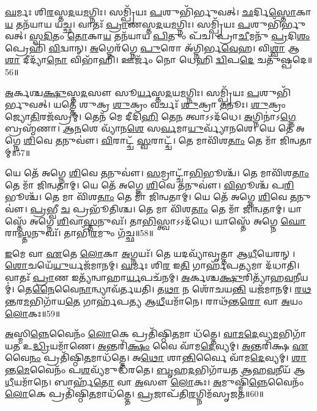\-\ul{𑌘}\-𑌰𑍍𑌮𑌃 𑌶𑌿\-\ul{𑌰}\-𑌸𑍍𑌤\-\ul{𑌦}\-𑌯\-\ul{𑌮}\-𑌗𑍍𑌨𑌿𑌃।
𑌸𑌮𑍍𑌪𑍍𑌰𑌿᳴𑌯𑌃 \ul{𑌪}\-𑌶𑍁𑌭𑌿᳴𑌰𑍍𑌭𑍁𑌵𑌤𑍍।
\-\ul{𑌛}\-𑌰𑍍𑌦𑌿\-\ul{𑌸𑍍𑌤𑍋}\-𑌕𑌾\-\ul{𑌯} 𑌤𑌨᳴𑌯𑌾𑌯 𑌯𑌚𑍍𑌛।
𑌵𑌾𑌤𑌃᳴ \ul{𑌪𑍍𑌰𑌾}\-𑌣𑌸𑍍𑌤\-\ul{𑌦}\-𑌯\-\ul{𑌮}\-𑌗𑍍𑌨𑌿𑌃।
𑌸𑌮𑍍𑌪𑍍𑌰𑌿᳴𑌯𑌃 \ul{𑌪}\-𑌶𑍁𑌭𑌿᳴𑌰𑍍𑌭𑍁𑌵𑌤𑍍।
\-\ul{𑌸𑍍𑌵}\-\-\ul{𑌦𑌿}\-𑌤𑌂 \ul{𑌤𑍋}\-𑌕𑌾\-\ul{𑌯} 𑌤𑌨᳴𑌯𑌾𑌯 \ul{𑌪𑌿}\-𑌤𑍁𑌂 𑌪᳴𑌚।
𑌪𑍍𑌰𑌾\-\ul{𑌚𑍀}\-𑌮𑌨𑍁᳴ \ul{𑌪𑍍𑌰}\-𑌦𑌿\-\ul{𑌶𑌂} 𑌪𑍍𑌰𑍇𑌹𑌿᳴ \ul{𑌵𑌿}\-𑌦𑍍𑌵𑌾𑌨𑍍।
\-\ul{𑌅}\-𑌗𑍍𑌨𑍇𑌰᳴𑌗𑍍𑌨𑍇 \ul{𑌪𑍁}\-𑌰𑍋 𑌅᳴𑌗𑍍𑌨𑌿𑌰𑍍𑌭\-\ul{𑌵𑍇}\-𑌹।
𑌵𑌿\-\ul{𑌶𑍍𑌵𑌾} 𑌆\-\ul{𑌶𑌾} 𑌦𑍀𑌦𑍍𑌯𑌾᳴\-\ul{𑌨𑍋} 𑌵𑌿𑌭𑌾᳴𑌹𑌿।
𑌊𑌰𑍍𑌜𑌂᳴ 𑌨𑍋 𑌧𑍇𑌹𑌿 \ul{𑌦𑍍𑌵𑌿}\-𑌪\-\ul{𑌦𑍇} 𑌚𑌤𑍁᳴𑌷𑍍𑌪𑌦𑍇॥56॥

\-\ul{𑌅}\-𑌰𑍍𑌕𑌶𑍍𑌚\-\ul{𑌕𑍍𑌷𑍁}\-𑌸𑍍𑌤\-\ul{𑌦}\-𑌸𑍗 𑌸𑍂\-\ul{𑌰𑍍𑌯}\-𑌸𑍍𑌤\-\ul{𑌦}\-𑌯\-\ul{𑌮}\-𑌗𑍍𑌨𑌿𑌃।
𑌸𑌮𑍍𑌪𑍍𑌰𑌿᳴𑌯𑌃 \ul{𑌪}\-𑌶𑍁𑌭𑌿᳴𑌰𑍍𑌭𑍁𑌵𑌤𑍍।
𑌯𑌤𑍍𑌤𑍇᳴ 𑌶𑍁𑌕𑍍𑌰 \ul{𑌶𑍁}\-𑌕𑍍𑌰𑌂 𑌵𑌰𑍍𑌚𑌃᳴ \ul{𑌶𑍁}\-𑌕𑍍𑌰𑌾 \ul{𑌤}\-𑌨𑍂𑌃।
\-\ul{𑌶𑍁}\-𑌕𑍍𑌰𑌂 𑌜𑍍𑌯𑍋\-\ul{𑌤𑌿}\-𑌰𑌜᳴𑌸𑍍𑌰𑌮𑍍।
𑌤𑍇𑌨᳴ 𑌮𑍇 𑌦𑍀𑌦𑌿\-\ul{𑌹𑌿} 𑌤𑍇\-\ul{𑌨} 𑌤𑍍𑌵𑌾𑌽𑌽𑌦᳴𑌧𑍇।
\-\ul{𑌅}\-𑌗𑍍𑌨𑌿𑌨𑌾॑\-𑌽\-\ul{𑌗𑍍𑌨𑍇} 𑌬𑍍𑌰𑌹𑍍𑌮᳴𑌣𑌾।
\-\ul{𑌆}\-\-\ul{𑌨}\-𑌶𑍇 𑌵𑍍𑌯𑌾᳴𑌨\-\ul{𑌶𑍇} 𑌸\-\ul{𑌰𑍍𑌵}\-𑌮𑌾\-\ul{𑌯𑍁}\-𑌰𑍍𑌵𑍍𑌯𑌾᳴𑌨𑌶𑍇।
𑌯𑍇 𑌤𑍇᳴ 𑌅𑌗𑍍𑌨𑍇 \ul{𑌶𑌿}\-𑌵𑍇 \ul{𑌤}\-𑌨𑍁𑌵𑍗॑।
\-\ul{𑌵𑌿}\-𑌰𑌾𑌟𑍍𑌚᳴ \ul{𑌸𑍍𑌵}\-𑌰𑌾𑌟𑍍𑌚᳴।
𑌤𑍇 𑌮𑌾𑌵𑌿᳴𑌶\-\ul{𑌤𑌾𑌂} 𑌤𑍇 𑌮𑌾᳴ 𑌜𑌿𑌨𑍍𑌵𑌤𑌾𑌮𑍍॥57॥

𑌯𑍇 𑌤𑍇᳴ 𑌅𑌗𑍍𑌨𑍇 \ul{𑌶𑌿}\-𑌵𑍇 \ul{𑌤}\-𑌨𑍁𑌵𑍗॑।
\-\ul{𑌸}\-𑌮𑍍𑌰𑌾𑌟𑍍𑌚𑌾᳴\-\ul{𑌭𑌿}\-𑌭𑍂𑌶𑍍𑌚᳴।
𑌤𑍇 𑌮𑌾𑌵𑌿᳴𑌶\-\ul{𑌤𑌾𑌂} 𑌤𑍇 𑌮𑌾᳴ 𑌜𑌿𑌨𑍍𑌵𑌤𑌾𑌮𑍍।
𑌯𑍇 𑌤𑍇᳴ 𑌅𑌗𑍍𑌨𑍇 \ul{𑌶𑌿}\-𑌵𑍇 \ul{𑌤}\-𑌨𑍁𑌵𑍗॑।
\-\ul{𑌵𑌿}\-𑌭𑍂𑌶𑍍𑌚᳴ 𑌪\-\ul{𑌰𑌿}\-𑌭𑍂𑌶𑍍𑌚᳴।
𑌤𑍇 𑌮𑌾 𑌵𑌿᳴𑌶\-\ul{𑌤𑌾𑌂} 𑌤𑍇 𑌮𑌾᳴ 𑌜𑌿𑌨𑍍𑌵𑌤𑌾𑌮𑍍।
𑌯𑍇 𑌤𑍇᳴ 𑌅𑌗𑍍𑌨𑍇 \ul{𑌶𑌿}\-𑌵𑍇 \ul{𑌤}\-𑌨𑍁𑌵𑍗॑।
\-\ul{𑌪𑍍𑌰}\-𑌭𑍍𑌵𑍀 \ul{𑌚} 𑌪𑍍𑌰𑌭𑍂᳴𑌤𑌿𑌶𑍍𑌚।
𑌤𑍇 𑌮𑌾 𑌵𑌿᳴𑌶\-\ul{𑌤𑌾𑌂} 𑌤𑍇 𑌮𑌾᳴ 𑌜𑌿𑌨𑍍𑌵𑌤𑌾𑌮𑍍।
𑌯𑌾𑌸𑍍𑌤𑍇᳴ 𑌅𑌗𑍍𑌨𑍇 \ul{𑌶𑌿}\-𑌵𑌾\-\ul{𑌸𑍍𑌤}\-𑌨𑍁𑌵𑌃᳴।
𑌤𑌾\-\ul{𑌭𑌿}\-𑌸𑍍𑌤𑍍𑌵𑌾𑌽𑌽𑌦᳴𑌧𑍇।
𑌯𑌾𑌸𑍍𑌤𑍇᳴ 𑌅𑌗𑍍𑌨𑍇 \ul{𑌘𑍋}\-𑌰𑌾\-\ul{𑌸𑍍𑌤}\-𑌨𑍁𑌵𑌃᳴।
𑌤𑌾𑌭𑌿᳴\-\ul{𑌰}\-𑌮𑍁𑌂 𑌗᳴𑌚𑍍𑌛॥58॥\anuvakamend[𑌚𑌤𑍁᳴𑌷𑍍𑌪𑌦𑍇 𑌜𑌿𑌨𑍍𑌵𑌤𑌾𑌂 \ul{𑌤}\-𑌨𑍁\-\ul{𑌵}\-𑌸𑍍𑌤𑍍𑌰𑍀𑌣𑌿᳴ 𑌚]

\-\ul{𑌇}\-𑌮𑍇 𑌵𑌾 \ul{𑌏}\-𑌤𑍇 \ul{𑌲𑍋}\-𑌕𑌾 \ul{𑌅}\-𑌗𑍍𑌨𑌯𑌃᳴।
𑌤𑍇 𑌯𑌦𑌵𑍍𑌯𑌾᳴𑌵𑍃𑌤𑍍𑌤𑌾 𑌆\-\ul{𑌧𑍀}\-𑌯𑍇𑌰𑌨𑍍।
\-\ul{𑌶𑍋}\-𑌚𑌯𑍇᳴\-\ul{𑌯𑍁}\-𑌰𑍍𑌯𑌜᳴𑌮𑌾𑌨𑌮𑍍।
\-\ul{𑌘}\-𑌰𑍍𑌮𑌃 𑌶𑌿\-\ul{𑌰} 𑌇\-\ul{𑌤𑌿} 𑌗𑌾𑌰𑍍\mbox{}𑌹᳴𑌪\-\ul{𑌤𑍍𑌯}\-𑌮𑌾 𑌦᳴𑌧𑌾𑌤𑌿।
𑌵𑌾𑌤𑌃᳴ \ul{𑌪𑍍𑌰𑌾}\-𑌣 𑌇𑌤𑍍𑌯᳴𑌨𑍍𑌵𑌾𑌹𑌾\-\ul{𑌰𑍍𑌯}\-𑌪𑌚᳴𑌨𑌮𑍍।
\-\ul{𑌅}\-𑌰𑍍𑌕𑌶𑍍𑌚\-\ul{𑌕𑍍𑌷𑍁}\-𑌰𑌿𑌤𑍍𑌯𑌾᳴𑌹\-\ul{𑌵}\-𑌨𑍀𑌯𑌮𑍍॑।
𑌤𑍇\-\ul{𑌨𑍈}\-𑌵𑍈\-\ul{𑌨𑌾}\-𑌨𑍍𑌵𑍍𑌯𑌾𑌵᳴𑌰𑍍𑌤𑌯𑌤𑌿।
𑌤\-\ul{𑌥𑌾} 𑌨 𑌶𑍋᳴𑌚𑌯\-\ul{𑌨𑍍𑌤𑌿} 𑌯𑌜᳴𑌮𑌾𑌨𑌮𑍍।
\-\ul{𑌰}\-\-\ul{𑌥}\-\-\ul{𑌨𑍍𑌤}\-𑌰\-\ul{𑌮}\-𑌭𑌿𑌗𑌾᳴𑌯\-\ul{𑌤𑍇} 𑌗𑌾𑌰𑍍\mbox{}𑌹᳴𑌪𑌤𑍍𑌯 𑌆\-\ul{𑌧𑍀}\-𑌯𑌮𑌾᳴𑌨𑍇।
𑌰𑌾𑌥᳴𑌨𑍍𑌤\-\ul{𑌰𑍋} 𑌵𑌾 \ul{𑌅}\-𑌯𑌂 \ul{𑌲𑍋}\-𑌕𑌃॥59॥

\-\ul{𑌅}\-𑌸𑍍𑌮𑌿\-\ul{𑌨𑍍𑌨𑍇}\-𑌵𑍈𑌨𑌂᳴ \ul{𑌲𑍋}\-𑌕𑍇 𑌪𑍍𑌰𑌤𑌿᳴\-𑌷𑍍𑌠𑌿\-\ul{𑌤}\-𑌮𑌾 𑌧᳴𑌤𑍍𑌤𑍇।
\-\ul{𑌵𑌾}\-\-\ul{𑌮}\-\-\ul{𑌦𑍇}\-𑌵𑍍𑌯\-\ul{𑌮}\-𑌭𑌿𑌗𑌾᳴𑌯𑌤 𑌉\-\ul{𑌦𑍍𑌧𑍍𑌰𑌿}\-𑌯𑌮𑌾᳴𑌣𑍇।
\-\ul{𑌅}\-𑌨𑍍𑌤𑌰𑌿᳴\-\ul{𑌕𑍍𑌷𑌂} 𑌵𑍈 𑌵𑌾᳴𑌮\-\ul{𑌦𑍇}\-𑌵𑍍𑌯𑌮𑍍।
\-\ul{𑌅}\-𑌨𑍍𑌤𑌰𑌿᳴𑌕𑍍𑌷 \ul{𑌏}\-𑌵𑍈\-\ul{𑌨𑌂} 𑌪𑍍𑌰𑌤𑌿᳴\-𑌷𑍍𑌠𑌿\-\ul{𑌤}\-𑌮𑌾𑌧᳴𑌤𑍍𑌤𑍇।
𑌅\-\ul{𑌥𑍋} 𑌶𑌾\-\ul{𑌨𑍍𑌤𑌿}\-𑌰𑍍𑌵𑍈 𑌵𑌾᳴𑌮\-\ul{𑌦𑍇}\-𑌵𑍍𑌯𑌮𑍍।
\-\ul{𑌶𑌾}\-𑌨𑍍𑌤\-\ul{𑌮𑍇}\-𑌵𑍈𑌨𑌂᳴ 𑌪\-\ul{𑌶}\-𑌵𑍍𑌯᳴𑌮𑍁𑌦𑍍𑌧᳴𑌰𑌤𑍇।
\-\ul{𑌬𑍃}\-𑌹\-\ul{𑌦}\-𑌭𑌿𑌗𑌾᳴𑌯𑌤 𑌆𑌹\-\ul{𑌵}\-𑌨𑍀𑌯᳴ 𑌆\-\ul{𑌧𑍀}\-𑌯𑌮𑌾᳴𑌨𑍇।
𑌬𑌾𑌰𑍍\mbox{}𑌹᳴\-\ul{𑌤𑍋} 𑌵𑌾 \ul{𑌅}\-𑌸𑍗 \ul{𑌲𑍋}\-𑌕𑌃।
\-\ul{𑌅}\-𑌮𑍁𑌷𑍍𑌮𑌿᳴\-\ul{𑌨𑍍𑌨𑍇}\-𑌵𑍈𑌨𑌂᳴ \ul{𑌲𑍋}\-𑌕𑍇 𑌪𑍍𑌰𑌤𑌿᳴\-𑌷𑍍𑌠𑌿\-\ul{𑌤}\-𑌮𑌾𑌧᳴𑌤𑍍𑌤𑍇।
\-\ul{𑌪𑍍𑌰}\-𑌜𑌾𑌪᳴𑌤𑌿\-\ul{𑌰}\-𑌗𑍍𑌨𑌿𑌮᳴\-𑌸𑍃𑌜𑌤॥60॥

